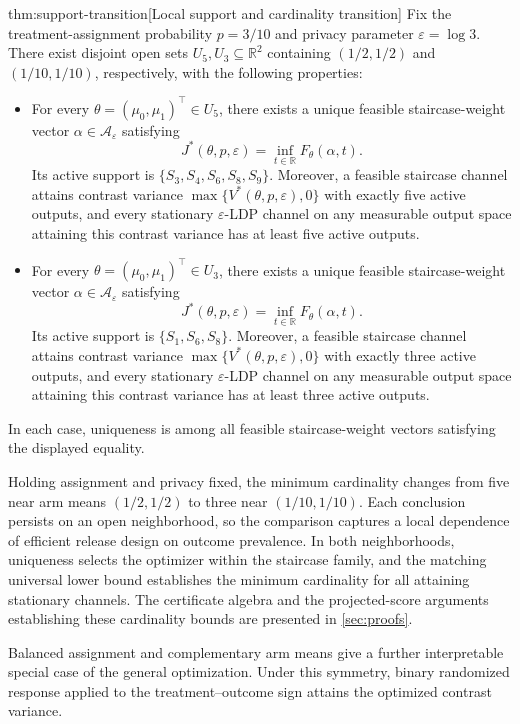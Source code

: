 \documentclass[11pt]{article}
\begin{document}
\begin{theoremv}{thm:support-transition}[Local support and cardinality transition]
Fix the treatment-assignment probability \(p=3/10\) and privacy parameter \(\varepsilon=\log 3\). There exist disjoint open sets \(U_5,U_3\subseteq\mathbb R^2\) containing \((1/2,1/2)\) and \((1/10,1/10)\), respectively, with the following properties:
\begin{itemize}
\item For every \(\theta=(\mu_0,\mu_1)^\top\in U_5\), there exists a unique feasible staircase-weight vector \(\alpha\in\mathcal A_\varepsilon\) satisfying
\[
J^*(\theta,p,\varepsilon)
=
\inf_{t\in\mathbb R}F_\theta(\alpha,t).
\]
Its active support is \(\{S_3,S_4,S_6,S_8,S_9\}\). Moreover, a feasible staircase channel attains contrast variance \(\max\{V^*(\theta,p,\varepsilon),0\}\) with exactly five active outputs, and every stationary \(\varepsilon\)-LDP channel on any measurable output space attaining this contrast variance has at least five active outputs.
\item For every \(\theta=(\mu_0,\mu_1)^\top\in U_3\), there exists a unique feasible staircase-weight vector \(\alpha\in\mathcal A_\varepsilon\) satisfying
\[
J^*(\theta,p,\varepsilon)
=
\inf_{t\in\mathbb R}F_\theta(\alpha,t).
\]
Its active support is \(\{S_1,S_6,S_8\}\). Moreover, a feasible staircase channel attains contrast variance \(\max\{V^*(\theta,p,\varepsilon),0\}\) with exactly three active outputs, and every stationary \(\varepsilon\)-LDP channel on any measurable output space attaining this contrast variance has at least three active outputs.
\end{itemize}
In each case, uniqueness is among all feasible staircase-weight vectors satisfying the displayed equality.
\end{theoremv}

Holding assignment and privacy fixed, the minimum cardinality changes from five near arm means \((1/2,1/2)\) to three near \((1/10,1/10)\). Each conclusion persists on an open neighborhood, so the comparison captures a local dependence of efficient release design on outcome prevalence. In both neighborhoods, uniqueness selects the optimizer within the staircase family, and the matching universal lower bound establishes the minimum cardinality for all attaining stationary channels. The certificate algebra and the projected-score arguments establishing these cardinality bounds are presented in \cref{sec:proofs}.

Balanced assignment and complementary arm means give a further interpretable special case of the general optimization. Under this symmetry, binary randomized response applied to the treatment--outcome sign attains the optimized contrast variance.
\end{document}

